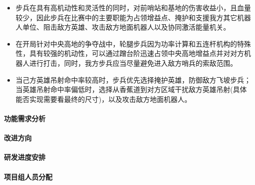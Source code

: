 
        \begin{itemize}
            \item 步兵在具有高机动性和灵活性的同时，对前哨站和基地的伤害收益小，且血量较少，因此步兵在比赛中的主要职能为占领增益点、掩护和支援我方其它机器人单位、阻击敌方英雄、攻击敌方地面机器人以及协同激活能量机关。
            \item 在开局针对中央高地的争夺战中，轮腿步兵因为功率计算和五连杆机构的特殊性，具有较强的机动性，可以通过蹭台阶迅速占领中央高地增益点并对对方机器人进行打击，同时，我方步兵应当尽量避免进入敌方哨兵的索敌范围。
            \item 当己方英雄吊射命中率较高时，步兵优先选择掩护英雄，防御敌方飞坡步兵；当英雄吊射命中率偏低时，选择从香蕉道到对方区域干扰敌方英雄吊射(具体能否实现需要看最终的尺寸)，以及攻击敌方地面机器人。
        \end{itemize}
    
    \paragraph{功能需求分析}

    
    \paragraph{改进方向}


    \paragraph{研发进度安排}


    \paragraph{项目组人员分配}

    